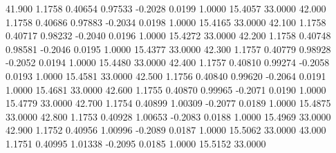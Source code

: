   41.900   1.1758   0.40654   0.97533  -0.2028   0.0199   1.0000  15.4057  33.0000
  42.000   1.1758   0.40686   0.97883  -0.2034   0.0198   1.0000  15.4165  33.0000
  42.100   1.1758   0.40717   0.98232  -0.2040   0.0196   1.0000  15.4272  33.0000
  42.200   1.1758   0.40748   0.98581  -0.2046   0.0195   1.0000  15.4377  33.0000
  42.300   1.1757   0.40779   0.98928  -0.2052   0.0194   1.0000  15.4480  33.0000
  42.400   1.1757   0.40810   0.99274  -0.2058   0.0193   1.0000  15.4581  33.0000
  42.500   1.1756   0.40840   0.99620  -0.2064   0.0191   1.0000  15.4681  33.0000
  42.600   1.1755   0.40870   0.99965  -0.2071   0.0190   1.0000  15.4779  33.0000
  42.700   1.1754   0.40899   1.00309  -0.2077   0.0189   1.0000  15.4875  33.0000
  42.800   1.1753   0.40928   1.00653  -0.2083   0.0188   1.0000  15.4969  33.0000
  42.900   1.1752   0.40956   1.00996  -0.2089   0.0187   1.0000  15.5062  33.0000
  43.000   1.1751   0.40995   1.01338  -0.2095   0.0185   1.0000  15.5152  33.0000
